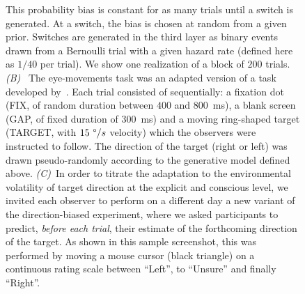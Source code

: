\documentclass[10pt,letterpaper]{article}
\newcommand{\ms}{\si{\milli\second}}%
\newcommand{\citet}[1]{\cite{#1}}
\begin{document}
\begin{figure}
{This probability bias is constant for as many trials until a switch is generated.
At a switch, the bias is chosen at random from a given prior.
Switches are generated in the third layer as binary events drawn from a Bernoulli trial
with a given hazard rate (defined here as $1/40$ per trial). We show one realization of a block of $200$ trials.
\textit{(B)}~
The eye-movements task was an adapted version of a task developed by~\citet{Montagnini2010}.
Each trial consisted of sequentially:
a fixation dot (FIX, of random duration between $400$ and $800$~\ms),
a blank screen (GAP, of fixed duration of  $300$~\ms) and
a moving ring-shaped target (TARGET, with $15~\degree/s$ velocity) which the observers were instructed to follow.
The direction of the target (right or left) was drawn pseudo-randomly
according to the generative model defined above.
\textit{(C)}~In order to titrate the adaptation
to the environmental volatility of target direction at the explicit and conscious level,
we invited each observer to perform on a different day a new variant of the direction-biased experiment,
where we asked participants to predict, \emph{before each trial}, %
their estimate of the forthcoming direction of the target.
As shown in this sample screenshot,
this was performed by moving a mouse cursor (black triangle) on a continuous rating scale
between ``Left'', to ``Unsure'' and finally ``Right''.
}
\label{fig:intro}
\end{figure}
\end{document}
